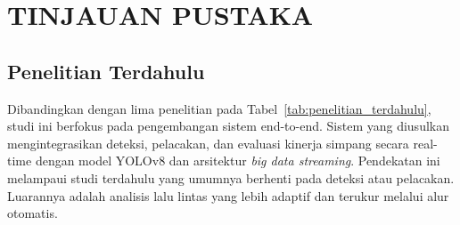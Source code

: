 
\chapter{TINJAUAN PUSTAKA}

\section{Penelitian Terdahulu}
Dibandingkan dengan lima penelitian pada Tabel~\ref{tab:penelitian_terdahulu},
studi ini berfokus pada pengembangan sistem end-to-end. Sistem yang diusulkan
mengintegrasikan deteksi, pelacakan, dan evaluasi kinerja simpang secara
real-time dengan model YOLOv8 dan arsitektur \textit{big data streaming}.
Pendekatan ini melampaui studi terdahulu yang umumnya berhenti pada deteksi
atau pelacakan. Luarannya adalah analisis lalu lintas yang lebih adaptif dan
terukur melalui alur otomatis.

\vspace{0.5\baselineskip}

